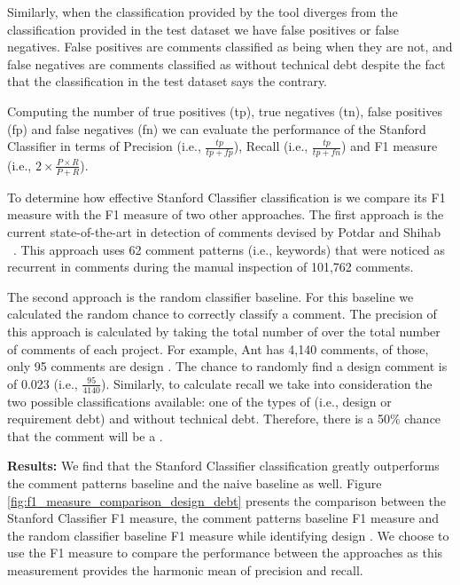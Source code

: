 Similarly, when the classification provided by the tool diverges from the classification provided in the test dataset we have false positives or false negatives. False positives are comments classified as being \SATD when they are not, and false negatives are comments classified as without technical debt despite the fact that the classification in the test dataset says the contrary.

Computing the number of true positives (tp), true negatives (tn), false positives (fp) and false negatives (fn) we can evaluate the performance of the Stanford Classifier in terms of Precision (i.e., $\frac{tp}{tp + fp}$), Recall (i.e., $\frac{tp}{tp + fn}$) and F1 measure (i.e., $2 \times \frac{P \times R}{P + R}$).

To determine how effective Stanford Classifier classification is we compare its F1 measure with the F1 measure of two other approaches. The first approach is the current state-of-the-art in detection of \SATD comments devised by Potdar and Shihab ~\cite{Potdar2014ICSME}. This approach uses 62 comment patterns (i.e., keywords) that were noticed as recurrent in \SATD comments during the manual inspection of 101,762 comments. 

The second approach is the random classifier baseline. For this baseline we calculated the random chance to correctly classify a \SATD comment. The precision of this approach is calculated by taking the total number of \SATD over the total number of comments of each project. For example, Ant has 4,140 comments, of those, only 95 comments are design \SATD. The chance to randomly find a design \SATD comment is of 0.023 (i.e., $\frac{95}{4140}$). Similarly, to calculate recall  we take into consideration the two possible classifications available: one of the types of \SATD (i.e., design or requirement debt) and without technical debt. Therefore, there is a 50\% chance that the comment will be a \SATD. 

\vspace{1mm}

\noindent \textbf{Results:} We find that the Stanford Classifier classification greatly outperforms the comment patterns baseline and the naive baseline as well. Figure \ref{fig:f1_measure_comparison_design_debt} presents the comparison between the Stanford Classifier F1 measure, the comment patterns baseline F1 measure and the random classifier baseline F1 measure while identifying design \SATD. We choose to use the F1 measure to compare the performance between the approaches as this measurement provides the harmonic mean of precision and recall.

